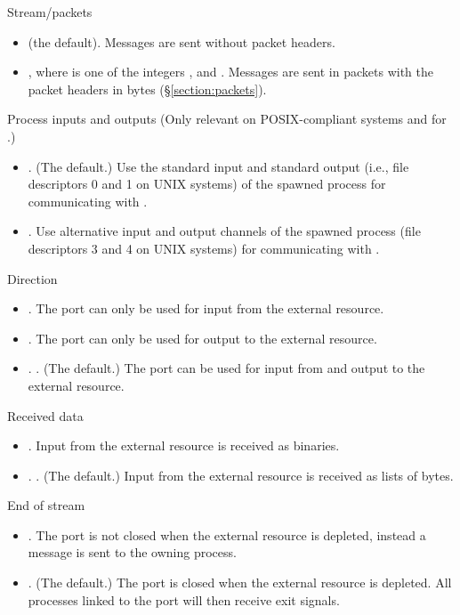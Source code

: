 \begin{Lentry}
\item[Stream/packets]
\begin{itemize}
\item {} (the default). Messages are sent without packet headers.
\item {}, where  is one of the integers , 
and .  Messages are sent in packets with the packet headers in  bytes
(\S\ref{section:packets}).
\end{itemize}
\item[Process inputs and outputs]
(Only relevant on POSIX-compliant systems and for .)
\begin{itemize}
\item {}.  (The default.)
Use the standard input and standard output (i.e., file descriptors 0 and 1 on UNIX
systems) of the
spawned process for communicating with \Erlang.
\item {}.
Use alternative input and output channels of the spawned process (file descriptors
3 and 4 on UNIX systems) for communicating with \Erlang.
\end{itemize}
\item[Direction]
\begin{itemize}
\item {}. The port can only be used for input from the external resource.
\item {}. The port can only be used for output to the external resource.
\item \ifOld {}. \fi \ifStd {}. (The default.) \fi
The port can be used for input from and output to the external resource.
\end{itemize}
\item[Received data]
\begin{itemize}
\item {}.  Input from the external resource is received as binaries.
\item \ifOld {}. \fi \ifStd {}. (The default.) \fi
Input from the external resource is received as lists of bytes.
\end{itemize}
\item[End of stream]
\begin{itemize}
\item {}.  The port is not closed when the external resource is depleted,
instead a message  is sent to the owning process.
\item {}.  (The default.) The port is closed when the external resource is depleted.
All processes linked to the port will then receive exit signals.
\end{itemize}
\end{Lentry}
